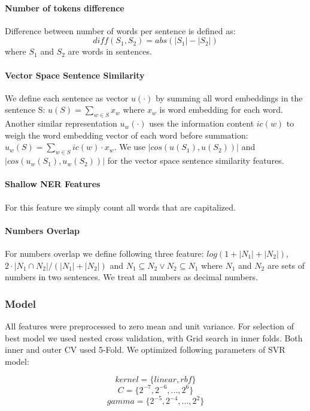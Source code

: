 \documentclass[10pt, a4paper]{article}
\begin{document}
\paragraph{Number of tokens difference \\}
Difference between number of words per sentence is defined as:
\begin{equation}\label{eq:word-diff}
diff(S_1, S_2) = abs(|S_1| - |S_2|)
\end{equation}
where $S_1$ and $S_2$ are words in sentences.
\paragraph{Vector Space Sentence Similarity \\}
We define each sentence as vector $u(\cdot)$ by summing all word embeddings in the sentence S: $ u(S) = \sum_{w \in S} x_w$ where $x_w$ is word embedding for each word. Another similar
representation $u_w(\cdot)$ uses the information content
$ic(w)$ to weigh the word embedding vector of each word
before summation: $u_w(S) = \sum_{w \in S} ic(w) \cdot x_w.$
We use $|cos(u(S_1), u(S_2))|$ and $|cos(u_w(S_1), u_w(S_2))|$ for the vector space sentence similarity features. \citep{Saric2012TakeLabSF}
\paragraph{Shallow NER Features \\}
For this feature we simply count all words that are capitalized.
\paragraph{Numbers Overlap \\}
For numbers overlap we define following three feature: $log(1+|N_1|+|N_2|)$, $2\cdot|N_1 \cap N_2|/(|N_1|+|N_2|)$ and $N_1 \subseteq N_2 \vee N_2 \subseteq N_1$
where $N_1$ and $N_2$ are sets of numbers in two sentences. We treat all numbers as decimal numbers.

\subsubsection{Model}
All features were preprocessed to zero mean and unit variance. For selection of best model we used nested cross validation, with Grid search in inner folds. Both inner and outer CV used 5-Fold. We optimized following parameters of SVR model:

\[ kernel = \{ linear, rbf \} \]
\[ C = \{ 2^{-7},2^{-6}, ..., 2^6 \} \]
\[ gamma = \{ 2^{-5}, 2^{-4},..., 2^2 \} \]
\end{document}
